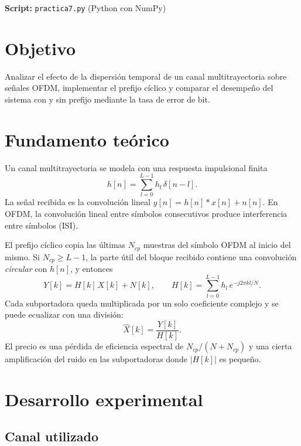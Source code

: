 \documentclass[11pt,a4paper]{article}
\begin{document}

\textbf{Script:} \texttt{practica7.py} (Python con NumPy)

\section{Objetivo}

Analizar el efecto de la dispersión temporal de un canal multitrayectoria sobre señales
OFDM, implementar el prefijo cíclico y comparar el desempeño del sistema con y sin prefijo
mediante la tasa de error de bit.

\section{Fundamento teórico}

Un canal multitrayectoria se modela con una respuesta impulsional finita
\begin{equation}
  h[n] = \sum_{l=0}^{L-1} h_l\,\delta[n-l].
\end{equation}
La señal recibida es la convolución lineal $y[n]=h[n]*x[n]+n[n]$. En OFDM, la convolución
lineal entre símbolos consecutivos produce interferencia entre símbolos (ISI).

El prefijo cíclico copia las últimas $N_{cp}$ muestras del símbolo OFDM al inicio del
mismo. Si $N_{cp}\ge L-1$, la parte útil del bloque recibido contiene una convolución
\emph{circular} con $h[n]$, y entonces
\begin{equation}
  Y[k] = H[k]\,X[k] + N[k],
  \qquad
  H[k] = \sum_{l=0}^{L-1} h_l\,e^{-j2\pi kl/N}.
\end{equation}
Cada subportadora queda multiplicada por un solo coeficiente complejo y se puede ecualizar
con una división:
\begin{equation}
  \hat{X}[k] = \frac{Y[k]}{H[k]}.
\end{equation}
El precio es una pérdida de eficiencia espectral de $N_{cp}/(N+N_{cp})$ y una cierta
amplificación del ruido en las subportadoras donde $|H[k]|$ es pequeño.

\section{Desarrollo experimental}

\subsection{Canal utilizado}
\end{document}
